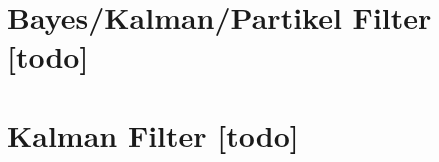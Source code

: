 \section{Bayes/Kalman/Partikel Filter [todo]}


\begin{comment}
------------------------------------------------------------------------------------------
- \cite{kalman1960new}
- \cite{kurth2003experimental}
	- Originally introduced in 1960, the Kalman lter assumes a multivariate Gaussian distribution [6]. The Kalman lter has the advantage that the representation of the distribution is compact; a Gaussian distribution can be represented by a mean and a covariance matrix. The robot's pose estimation is maintained as a Gaussian distribution and sensor data from dead reckoning and landmark observations is fused to obtain a new position distribution.
	- Our results with Kalman ltering require an under-standing of the characteristics of the noise present in ranges reported by the radio tags. We gain this by look-ing at the probability distribution functions for each tag measurement.
	- We obtain the PDFs as follows: for every reported measurement, we nd the true range to the robot when that distance was reported. We do this by comparing the known location of the reporting tag to the times-tamped true location of the robot when the report was received.
	- the covariance matrix, which describes the uncertainty and correlation of the terms in the state estimate.
	- However, when the same initial noisy tag locations are used with Test 2, our SLAM technique fails to converge. Since the Kalman lter uses a linearization of the nonlinear range measurements, if the linearized estimate is too far away from the truth, the lter may be unable to recover and will diverge.
	-

\end{comment}
\section{Kalman Filter [todo]}




\begin{comment}
------------------------------------------------------------------------------------------
- \cite{kurth2003experimental}
	- Recent extensions of Kalman ltering allow for non-Gaussian, multimodal probability distributions through multiple hypothesis tracking. The result is a more versatile estimation technique that still preserves many of the computational advantages of the Kalman filter.
\end{comment}

